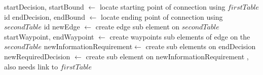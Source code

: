 \documentclass{article}
\begin{document}
\begin{center}
\begin{minipage}{1.2\textwidth}
\begin{algorithm}[H]
\SetAlgoLined
{}\;
\Indp startDecision, startBound $\leftarrow$ locate starting point of connection using $firstTable$ id\;
endDecision, endBound $\leftarrow$ locate ending point of connection using $secondTable$ id \;
newEdge $\leftarrow$ create edge sub element on $secondTable$\;
startWaypoint, endWaypoint $\leftarrow$ create waypoints sub elements of edge on the $secondTable$\;
newInformationRequirement$\leftarrow$ create sub elements on endDecision\;
newRequiredDecision $\leftarrow$ create sub element on newInformationRequirement , also needs link to $firstTable$

\caption{Create connection for tables}
\end{algorithm}
\end{minipage}
\end{center}
\end{document}
